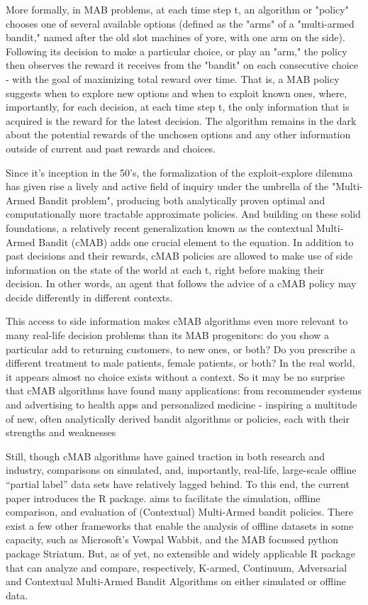 \documentclass[nojss]{jss}\usepackage[]{graphicx}\usepackage[]{color}
\begin{document}
More formally, in MAB problems, at each time step t, an algorithm or "policy" chooses one of several available options (defined as the "arms" of a "multi-armed bandit," named after the old slot machines of yore, with one arm on the side).  Following its decision to make a particular choice, or play an "arm," the policy then observes the reward it receives from the "bandit" on each consecutive choice - with the goal of maximizing total reward over time. That is, a MAB policy suggests when to explore new options and when to exploit known ones, where, importantly, for each decision, at each time step t, the only information that is acquired is the reward for the latest decision. The algorithm remains in the dark about the potential rewards of the unchosen options and any other information outside of current and past rewards and choices.

Since it's inception in the 50's, the formalization of the exploit-explore dilemma has given rise a lively and active field of inquiry under the umbrella of the "Multi-Armed Bandit problem", producing both analytically proven optimal and computationally more tractable approximate policies. And building on these solid foundations, a relatively recent generalization known as the contextual Multi-Armed Bandit (cMAB) adds one crucial element to the equation. In addition to past decisions and their rewards, cMAB policies are allowed to make use of side information on the state of the world at each t, right before making their decision. In other words, an agent that follows the advice of a cMAB policy may decide differently in different contexts.

This access to side information makes cMAB algorithms even more relevant to many real-life decision problems than its MAB progenitors: do you show a particular add to returning customers, to new ones, or both? Do you prescribe a different treatment to male patients, female patients, or both? In the real world, it appears almost no choice exists without a context. So it may be no surprise that cMAB algorithms have found many applications: from recommender systems and advertising to health apps and personalized medicine - inspiring a multitude of new, often analytically derived bandit algorithms or policies, each with their strengths and weaknesses

Still, though cMAB algorithms have gained traction in both research and industry, comparisons on simulated, and, importantly, real-life, large-scale offline \textquotedblleft{}partial label\textquotedblright{} data sets have relatively lagged behind. To this end, the current paper introduces the  R package.  aims to facilitate the simulation, offline comparison, and evaluation of (Contextual) Multi-Armed bandit policies. There exist a few other frameworks that enable the analysis of offline datasets in some capacity, such as Microsoft's Vowpal Wabbit, and the MAB focussed python package Striatum. But, as of yet, no extensible and widely applicable R package that can analyze and compare, respectively, K-armed, Continuum, Adversarial and Contextual Multi-Armed Bandit Algorithms on either simulated or offline data.
\end{document}

